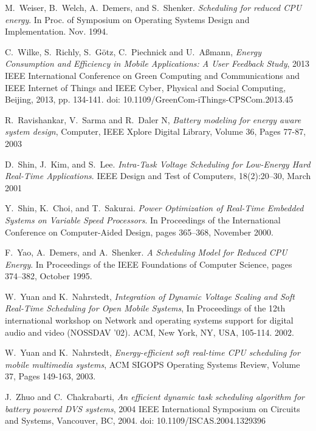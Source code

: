 \documentclass[10pt,article]{IEEEtran}
\begin{document}
\begin{thebibliography}{1}
M.~Weiser, B.~Welch, A.~Demers, and S.~Shenker. \emph{Scheduling for reduced CPU energy}. In Proc. of Symposium on Operating Systems Design and Implementation. Nov. 1994.
    
C.~Wilke, S.~Richly, S.~Götz, C.~Piechnick and U.~Aßmann, \emph{Energy Consumption and Efficiency in Mobile Applications: A User Feedback Study}, 2013 IEEE International Conference on Green Computing and Communications and IEEE Internet of Things and IEEE Cyber, Physical and Social Computing, Beijing, 2013, pp. 134-141.
doi: 10.1109/GreenCom-iThings-CPSCom.2013.45

R.~Ravishankar, V.~Sarma and R.~Daler N, \emph{Battery modeling for energy aware system design},  Computer, IEEE Xplore Digital Library, Volume 36, Pages 77-87, 2003

D.~Shin, J.~Kim, and S.~Lee.  \emph{Intra-Task Voltage Scheduling for Low-Energy Hard Real-Time Applications}. IEEE Design and Test of Computers, 18(2):20–30, March 2001

Y.~Shin, K.~Choi, and  T.~Sakurai. \emph{Power  Optimization  of Real-Time  Embedded  Systems  on  Variable  Speed  Processors}. In Proceedings of the International Conference on Computer-Aided Design, pages 365–368, November 2000.

F.~Yao, A.~Demers, and A.~Shenker. \emph{A Scheduling Model for Reduced CPU Energy}. In Proceedings of the IEEE Foundations of Computer Science, pages 374–382, October 1995.

W.~Yuan and K.~Nahrstedt, \emph{Integration of Dynamic Voltage Scaling and Soft Real-Time Scheduling for Open Mobile Systems}, In Proceedings of the 12th international workshop on Network and operating systems support for digital audio and video (NOSSDAV '02). ACM, New York, NY, USA, 105-114. 2002.

W.~Yuan and K.~Nahrstedt, \emph{Energy-efficient soft real-time CPU scheduling for mobile multimedia systems},  ACM SIGOPS Operating Systems Review, Volume 37, Pages 149-163, 2003.

J.~Zhuo and C.~Chakrabarti, \emph{An efficient dynamic task scheduling algorithm for battery powered DVS systems}, 2004 IEEE International Symposium on Circuits and Systems, Vancouver, BC, 2004. doi: 10.1109/ISCAS.2004.1329396

\end{thebibliography}
\end{document}
